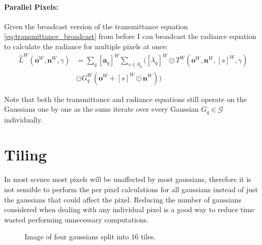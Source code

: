 \documentclass[a4paper, 11pt]{memoir}
\begin{document}
    \paragraph{Parallel Pixels:}
    \label{par:parallel_pixels}
    Given the broadcast version of the \gls{transmittance} equation \eqref{eq:transmittance_broadcast} from before I can broadcast the \gls{radiance} equation to
    calculate the \gls{radiance} for multiple pixels at once:
    \begin{equation}
        \begin{aligned}
            \hat{L}^W(\mathbf{o}^W, \mathbf{n}^W, \gamma) &= \sum_q [ \mathbf{a}_q ]^W \sum_{s \in S_q} \Big(
            [ \lambda_q ]^W \odot T^W(\mathbf{o}^W, \mathbf{n}^W, [ s ]^W, \gamma)\\
            &\odot G_q^W(\mathbf{o}^W + [ s ]^W \odot \mathbf{n}^W) \Big)
        \end{aligned}
        \label{eq:radiance_parallel_pixels}
    \end{equation}

    Note that both the \gls{transmittance} and \gls{radiance} equations still operate on the Gaussians one by one as the
    sums iterate over every Gaussian $G_q \in \mathcal{G}$ individually.

    \section{Tiling}
    \label{sec:tiling}
    In most scenes most pixels will be unaffected by most gaussians, therefore it is not sensible to perform
    the per pixel calculations for all gaussians instead of just the gaussians that could affect the pixel.
    Reducing the number of gaussians considered when dealing with any individual pixel is a good way to reduce
    time wasted performing unnecessary computations.

    \begin{figure}[H]
        \centering
        \caption{Image of four gaussians split into 16 tiles.}
        \label{fig:tiling}
    \end{figure}
\end{document}
